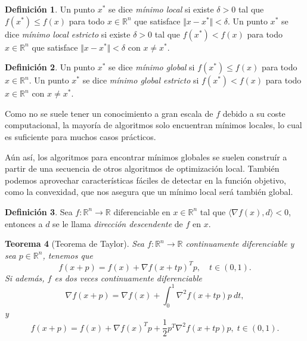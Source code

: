 \documentclass[11pt,a4paper]{book}
\newtheorem{theorem}{Teorema}[chapter]
\theoremstyle{definition}
\newtheorem{definition}[theorem]{Definición}
\theoremstyle{remark}
\begin{document}
\begin{definition}
	Un punto $x^*$ se dice \textit{mínimo local} si existe $\delta > 0$ tal que $f(x^*) \leq f(x)$ para todo $x \in \mathbb{R}^n$ que satisface $\Vert x - x^* \Vert < \delta$.
	Un punto $x^*$ se dice \textit{mínimo local estricto} si existe $\delta > 0$ tal que $f(x^*) < f(x)$ para todo $x \in \mathbb{R}^n$ que satisface $\Vert x - x^* \Vert < \delta$ con $x \neq x^*$.
\end{definition}

\begin{definition}
	Un punto $x^*$ se dice \textit{mínimo global} si $f(x^*) \leq f(x)$ para todo $x \in \mathbb{R}^n$.
	Un punto $x^*$ se dice \textit{mínimo global estricto} si $f(x^*) < f(x)$ para todo $x \in \mathbb{R}^n$ con $x \neq x^*$.
\end{definition}

Como no se suele tener un conocimiento a gran escala de $f$ debido a su coste computacional,
la mayoría de algoritmos solo encuentran mínimos locales, lo cual es suficiente para muchos
casos prácticos.

Aún así, los algoritmos para encontrar mínimos globales se suelen construír a partir de una
secuencia de otros algoritmos de optimización local. También podemos aprovechar características
fáciles de detectar en la función objetivo, como la convexidad, que nos asegura que un mínimo
local será también global.




\begin{definition}
	Sea $f: \mathbb{R}^n \rightarrow \mathbb{R}$ diferenciable en
$x \in \mathbb{R}^n$ tal que $\langle \nabla f(x), d \rangle < 0$, entonces a $d$ se le llama \textit{dirección descendente} de $f$ en $x$.
\end{definition}

\begin{theorem}[Teorema de Taylor] %
	
	Sea $f: \mathbb{R}^n \rightarrow \mathbb{R}$ continuamente diferenciable y sea $p \in \mathbb{R}^n$, tenemos que 
	\begin{equation}
		f(x+p) = f(x) + \nabla f(x+tp)^Tp, \quad t\in (0,1).
	\end{equation}
	Si además, $f$ es dos veces continuamente diferenciable
	\begin{equation}
		\nabla f(x+p) = \nabla f(x)
		+ \int_0^1 \nabla^2 f(x+tp)p\:dt,
	\end{equation}
	y
	\begin{equation}
		f(x+p) = f(x) + \nabla f(x)^Tp
		+ \frac{1}{2}p^T \nabla^2 f(x+tp)p, \; t\in (0,1).
		\label{eq:thty}
	\end{equation}
\end{theorem}
\end{document}
